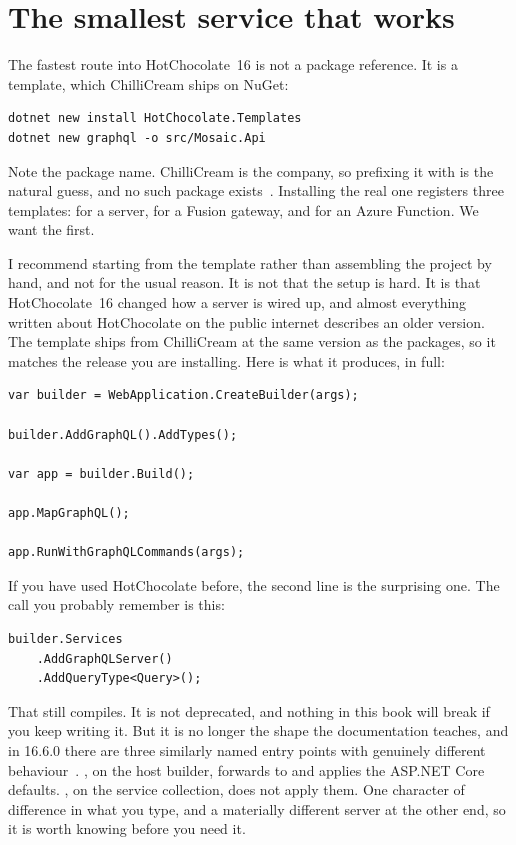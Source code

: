 \section{The smallest service that works}
\label{sec:ch02-smallest-service}

%
The fastest route into HotChocolate~16 is not a package reference. It is a
template, which ChilliCream ships on NuGet:

\begin{verbatim}
dotnet new install HotChocolate.Templates
dotnet new graphql -o src/Mosaic.Api
\end{verbatim}

Note the package name. ChilliCream is the company, so prefixing it with
 is the natural guess, and no such package
exists~\autocite{nuget2026templates}. Installing the real one registers three
templates:  for a server,  for a Fusion
gateway, and  for an Azure Function. We want the first.

I recommend starting from the template rather than assembling the project by
hand, and not for the usual reason. It is not that the setup is hard. It is that
HotChocolate~16 changed how a server is wired up, and almost everything written
about HotChocolate on the public internet describes an older version. The
template ships from ChilliCream at the same version as the packages, so it
matches the release you are installing. Here is what it produces, in full:

\begin{verbatim}
var builder = WebApplication.CreateBuilder(args);

builder.AddGraphQL().AddTypes();

var app = builder.Build();

app.MapGraphQL();

app.RunWithGraphQLCommands(args);
\end{verbatim}

%
If you have used HotChocolate before, the second line is the surprising one. The
call you probably remember is this:

\begin{verbatim}
builder.Services
    .AddGraphQLServer()
    .AddQueryType<Query>();
\end{verbatim}

That still compiles. It is not deprecated, and nothing in this book will break
if you keep writing it. But it is no longer the shape the documentation teaches,
and in 16.6.0 there are three similarly named entry points with genuinely
different behaviour~\autocite{chillicream2026source}.
, on the host builder, forwards to
 and applies the ASP.NET Core defaults.
, on the service collection, does not apply
them. One character of difference in what you type, and a materially different
server at the other end, so it is worth knowing before you need it.

